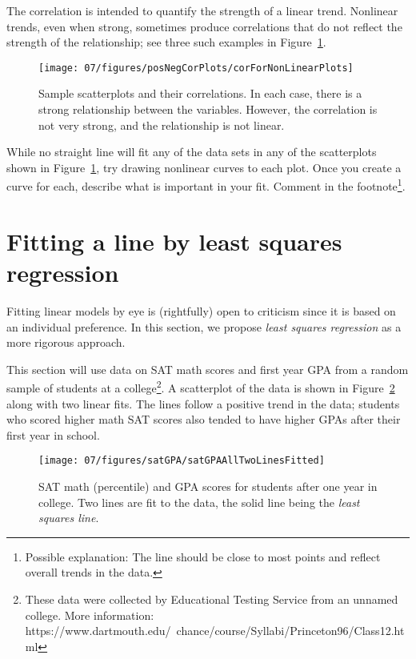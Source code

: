 The correlation is intended to quantify the strength of a linear trend. Nonlinear trends, even when strong, sometimes produce correlations that do not reflect the strength of the relationship; see three such examples in Figure~\ref{corForNonLinearPlots}.
\begin{figure}
   \centering
   \texttt{[image: 07/figures/posNegCorPlots/corForNonLinearPlots]}
   \caption{Sample scatterplots and their correlations. In each case, there is a strong relationship between the variables. However, the correlation is not very strong, and the relationship is not linear.}
   \label{corForNonLinearPlots}
\end{figure}

\begin{exercise}
While no straight line will fit any of the data sets in any of the scatterplots shown in Figure~\ref{corForNonLinearPlots}, try drawing nonlinear curves to each plot. Once you create a curve for each, describe what is important in your fit. Comment in the footnote\footnote{Possible explanation: The line should be close to most points and reflect overall trends in the data.}.
\end{exercise}

\section{Fitting a line by least squares regression}
\label{fittingALineByLSR}

Fitting linear models by eye is (rightfully) open to criticism since it is based on an individual preference. In this section, we propose \emph{least squares regression} as a more rigorous approach.

This section will use data on SAT math scores and first year GPA from a random sample of students at a college\footnote{These data were collected by Educational Testing Service from an unnamed college. More information:\\https://www.dartmouth.edu/~chance/course/Syllabi/Princeton96/Class12.html}. A scatterplot of the data is shown in Figure~\ref{satGPAAllTwoLinesFitted} along with two linear fits. The lines follow a positive trend in the data; students who scored higher math SAT scores also tended to have higher GPAs after their first year in school.
\begin{figure}
\centering
\texttt{[image: 07/figures/satGPA/satGPAAllTwoLinesFitted]}
\caption{SAT math (percentile) and GPA scores for students after one year in college. Two lines are fit to the data, the solid line being the \emph{least squares line}.}
\label{satGPAAllTwoLinesFitted}
\end{figure}

